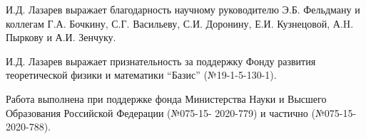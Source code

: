 И.Д. Лазарев выражает благодарность научному руководителю Э.Б. Фельдману и коллегам Г.А. Бочкину, С.Г. Васильеву, С.И. Доронину, Е.И. Кузнецовой, А.H. Пыркову и А.И. Зенчуку.

И.Д. Лазарев выражает признательность за поддержку Фонду развития теоретической физики и математики ``Базис'' (№19-1-5-130-1).

Работа выполнена при поддержке фонда Министерства Науки и Высшего Образования Российской Федерации (№075-15- 2020-779) и частично (№075-15-2020-788).